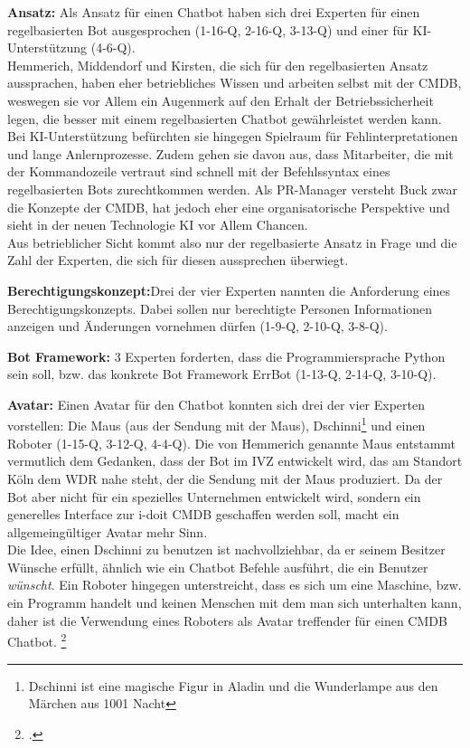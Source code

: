 \textbf{Ansatz:} Als Ansatz für einen Chatbot haben sich drei Experten für einen regelbasierten Bot ausgesprochen (1-16-Q, 2-16-Q, 3-13-Q) und einer für KI-Unterstützung (4-6-Q).\\
Hemmerich, Middendorf und Kirsten, die sich für den regelbasierten Ansatz aussprachen, haben eher betriebliches Wissen und arbeiten selbst mit der \acs{CMDB}, weswegen sie vor Allem ein Augenmerk auf den Erhalt der Betriebssicherheit legen, die besser mit einem regelbasierten Chatbot gewährleistet werden kann. Bei KI-Unterstützung befürchten sie hingegen Spielraum für Fehlinterpretationen und lange Anlernprozesse. Zudem gehen sie davon aus, dass Mitarbeiter, die mit der Kommandozeile vertraut sind schnell mit der Befehlssyntax eines regelbasierten Bots zurechtkommen werden. Als PR-Manager versteht Buck zwar die Konzepte der \acs{CMDB}, hat jedoch eher eine organisatorische Perspektive und sieht in der neuen Technologie KI vor Allem Chancen.\\
Aus betrieblicher Sicht kommt also nur der regelbasierte Ansatz in Frage und die Zahl der Experten, die sich für diesen aussprechen überwiegt. 

\textbf{Berechtigungskonzept:}Drei der vier Experten nannten die Anforderung eines Berechtigungskonzepts. Dabei sollen nur berechtigte Personen Informationen anzeigen und Änderungen vornehmen dürfen (1-9-Q, 2-10-Q, 3-8-Q).

\textbf{Bot Framework:} 3 Experten forderten, dass die Programmiersprache Python sein soll, bzw. das konkrete Bot Framework ErrBot (1-13-Q, 2-14-Q, 3-10-Q).

\textbf{Avatar:} Einen Avatar für den Chatbot konnten sich drei der vier Experten vorstellen: Die Maus (aus der Sendung mit der Maus), Dschinni\footnote{Dschinni ist eine magische Figur in Aladin und die Wunderlampe aus den Märchen aus 1001 Nacht} und einen Roboter (1-15-Q, 3-12-Q, 4-4-Q). Die von Hemmerich genannte Maus entstammt vermutlich dem Gedanken, dass der Bot im \acs{IVZ} entwickelt wird, das am Standort Köln dem \acs{WDR} nahe steht, der die Sendung mit der Maus produziert. Da der Bot aber nicht für ein spezielles Unternehmen entwickelt wird, sondern ein generelles Interface zur i-doit \acs{CMDB} geschaffen werden soll, macht ein allgemeingültiger Avatar mehr Sinn.\\
Die Idee, einen Dschinni zu benutzen ist nachvollziehbar, da er seinem Besitzer Wünsche erfüllt, ähnlich wie ein Chatbot Befehle ausführt, die ein Benutzer \textit{wünscht}. Ein Roboter hingegen unterstreicht, dass es sich um eine Maschine, bzw. ein Programm handelt und keinen Menschen mit dem man sich unterhalten kann, daher ist die Verwendung eines Roboters als Avatar treffender für einen \acs{CMDB} Chatbot.
\footcite[Vgl.][o. \pno]{WDR_Maus}

